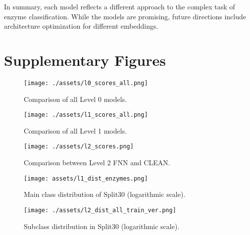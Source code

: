 \documentclass{bioinfo}
\begin{document}
In summary, each model reflects a different approach to the complex task of enzyme classification. 
While the models are promising, future directions include architecture optimization for different embeddings.

\section{Supplementary Figures}\label{sec:supplementary figures}
\begin{figure}[!ht]
	\texttt{[image: ./assets/l0\_scores\_all.png]}
	\caption{Comparison of all Level 0 models.}
	\label{fig:l0_comp_all}
\end{figure}
\begin{figure}[!bt]
	\texttt{[image: ./assets/l1\_scores\_all.png]}
	\caption{Comparison of all Level 1 models.}
	\label{fig:l1_comp_all}
\end{figure}

\begin{figure}[!bt]
	\texttt{[image: ./assets/l2\_scores.png]}
	\caption{Comparison between Level 2 FNN and CLEAN.}
	\label{fig:FNN_scores_l2}
\end{figure}

\begin{figure}[!hb]
\texttt{[image: assets/l1\_dist\_enzymes.png]}
\caption{Main class distribution of Split30 (logarithmic scale).}\label{fig:l1_dist_train}
\end{figure}

\begin{figure}[!ht]
\texttt{[image: ./assets/l2\_dist\_all\_train\_ver.png]}
\caption{Subclass distribution in Split30 (logarithmic scale).}\label{fig:l2_dist_train}
\end{figure}

\clearpage

 

\end{document}
